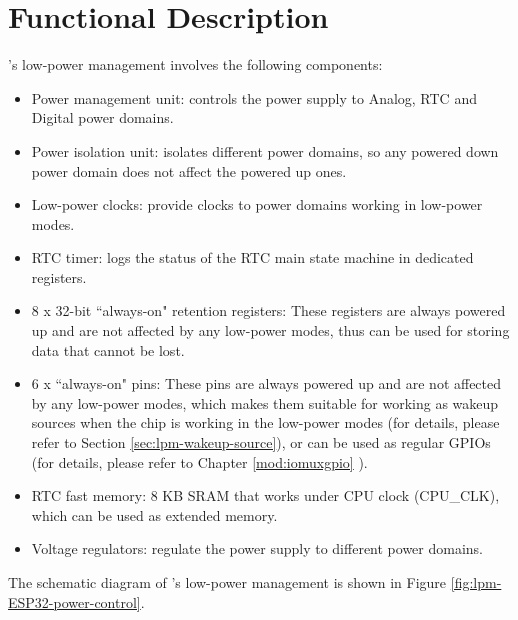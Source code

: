 \documentclass[main\_\_EN.tex]{subfiles}
\begin{document}
\section{Functional Description}

\chipname{}'s low-power management involves the following components:

\begin{itemize}
    \item Power management unit: controls the power supply to Analog, RTC and Digital power domains.
    \item Power isolation unit: isolates different power domains, so any powered down power domain does not affect the powered up ones.
    \item Low-power clocks: provide clocks to power domains working in low-power modes. 
    \item RTC timer: logs the status of the RTC main state machine in dedicated registers.
    \item 8 x 32-bit ``always-on" retention registers: These registers are always powered up and are not affected by any low-power modes, thus can be used for storing data that cannot be lost.
    \item 6 x ``always-on" pins: These pins are always powered up and are not affected by any low-power modes, which makes them suitable for working as wakeup sources when the chip is working in the low-power modes (for details, please refer to Section \ref{sec:lpm-wakeup-source}), or can be used as regular GPIOs (for details, please refer to Chapter \ref{mod:iomuxgpio} \textit{}).
    \item RTC fast memory: 8 KB SRAM that works under CPU clock (CPU\_CLK), which can be used as extended memory.
    \item Voltage regulators: regulate the power supply to different power domains.
\end{itemize}

The schematic diagram of \chipname{}'s low-power management is shown in Figure \ref{fig:lpm-ESP32-power-control}.
\end{document}
